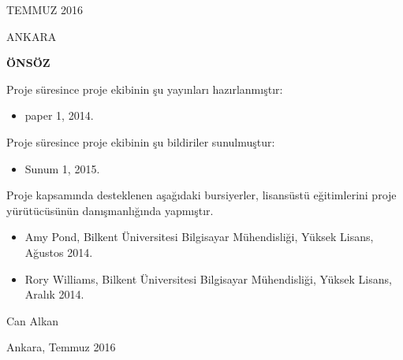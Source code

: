 \documentclass[11pt]{article}
\begin{document}
\bigskip





\begin{center}
{\Large TEMMUZ 2016

\vspace{1mm}
ANKARA}
\end{center}


\linespread{1.5}

\newpage\setlength{\parskip}{3mm} 
\onehalfspacing
\bigskip
{}
\setcounter{page}{1}

\begin{center}

  
{\LARGE \bf ÖNSÖZ}
\end{center}


Proje süresince proje ekibinin şu yayınları hazırlanmıştır: 

\begin{itemize}
\item paper 1, 2014.
  
\end{itemize}

Proje süresince proje ekibinin şu bildiriler sunulmuştur:
 
\begin{itemize}
\item Sunum 1, 2015.
  
\end{itemize}

Proje kapsamında desteklenen aşağıdaki bursiyerler,  lisansüstü eğitimlerini 
proje yürütücüsünün danışmanlığında
yapmıştır.
 
\begin{itemize}
\item Amy Pond, Bilkent Üniversitesi Bilgisayar Mühendisliği, Yüksek Lisans, Ağustos 2014.
\item Rory Williams, Bilkent Üniversitesi Bilgisayar Mühendisliği, Yüksek Lisans, Aralık 2014.
\end{itemize}


\bigskip
\hfill Can Alkan

\hfill Ankara, Temmuz 2016
\newpage

\setlength{\parskip}{1mm} 

\tableofcontents
\listoffigures
\listoftables



\newpage \setlength{\parskip}{3mm}
\phantom{ss}
\vspace{-2.5cm}
\sectionfont{\centering}
\end{document}
